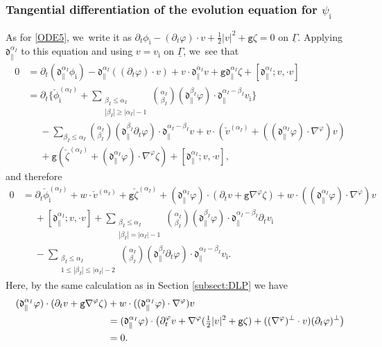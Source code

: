 \documentclass[JEP,XML,SOM,Unicode,NoFloatCountersInSection,published]{cedram}
\newcommand{\dpar}{{\mathfrak d}_{\parallel}}
\newcommand{\gr}{{\mathtt g}}
\newcommand{\dt}{\partial_t}
\newcommand{\ul}[1]{\underline{#1}}
\newcommand{\itGamma}{\mathit{\Gamma}}
\theoremstyle{definition}
\begin{document}
\subsubsection{Tangential differentiation of the evolution equation for $\psi_\mathrm{i}$}
As for \eqref{ODE5}, we~write it as $\dt\phi_\mathrm{i}-(\dt\varphi)\cdot v+\frac12|v|^2+\gr\zeta=0$ on $\ul{\itGamma}$.
Applying $\dpar^{\alpha_I}$ to this equation and using $v=v_\mathrm{i}$ on $\ul{\itGamma}$, we~see that
\begin{align*}
0 &= \dt(\dpar^{\alpha_I}\phi_\mathrm{i}) - \dpar^{\alpha_I}((\dt\varphi)\cdot v) + v\cdot\dpar^{\alpha_I}v + \gr\dpar^{\alpha_I}\zeta + [\dpar^{\alpha_I};v,\cdot v] \\
&= \dt\biggl\{ \check{\phi}_\mathrm{i}^{(\alpha_I)}
+ \sum_{\substack{\beta_I\leq\alpha_I\\ |\beta_I|\geq|\alpha_I|-1}} \binom{\alpha_I}{\beta_I}(\dpar^{\beta_I}\varphi)\cdot\dpar^{\alpha_I-\beta_I}v_\mathrm{i} \biggr\} \\
&\quad\; - \sum_{\beta_I\leq\alpha_I} \binom{\alpha_I}{\beta_I}(\dpar^{\beta_I}\dt\varphi)\cdot\dpar^{\alpha_I-\beta_I}v
+ v\cdot(\check{v}^{(\alpha_I)}+((\dpar^{\alpha_I}\varphi)\cdot\nabla^\varphi)v) \\
&\quad\; + \gr(\check{\zeta}^{(\alpha_I)}+(\dpar^{\alpha_I}\varphi)\cdot\nabla^\varphi\zeta)+ [\dpar^{\alpha_I};v,\cdot v],
\end{align*}
and therefore
\begin{align*}
0&= \dt\check{\phi}_\mathrm{i}^{(\alpha_I)} + w\cdot\check{v}^{(\alpha_I)} + \gr\check{\zeta}^{(\alpha_I)}
+ (\dpar^{\alpha_I}\varphi)\cdot(\dt v +\gr\nabla^\varphi\zeta) + w\cdot((\dpar^{\alpha_I}\varphi)\cdot\nabla^\varphi)v \\
&\quad\; + [\dpar^{\alpha_I};v,\cdot v]
+ \sum_{\substack{\beta_I\leq\alpha_I\\ |\beta_I|=|\alpha_I|-1}} \binom{\alpha_I}{\beta_I}(\dpar^{\beta_I}\varphi)\cdot\dpar^{\alpha_I-\beta_I}\dt v_\mathrm{i} \\
&\quad\; - \sum_{\substack{\beta_I\leq\alpha_I\\ 1\leq|\beta_I|\leq|\alpha_I|-2}} \binom{\alpha_I}{\beta_I}(\dpar^{\beta_I}\dt\varphi)\cdot\dpar^{\alpha_I-\beta_I}v_\mathrm{i}.
\end{align*}
Here, by the same calculation as in Section \ref{subsect:DLP} we have
\begin{align*}
(\dpar^{\alpha_I}\varphi)\cdot(\dt v +\gr\nabla^\varphi\zeta) &+ w\cdot((\dpar^{\alpha_I}\varphi)\cdot\nabla^\varphi)v \\
&= (\dpar^{\alpha_I}\varphi)\cdot\bigl(\dt^\varphi v + \nabla^\varphi(\tfrac12|v|^2+\mbox{\tt g}\zeta) + ((\nabla^\varphi)^\perp\cdot v)(\dt\varphi)^\perp \bigr) \\
&= 0.
\end{align*}
\end{document}
